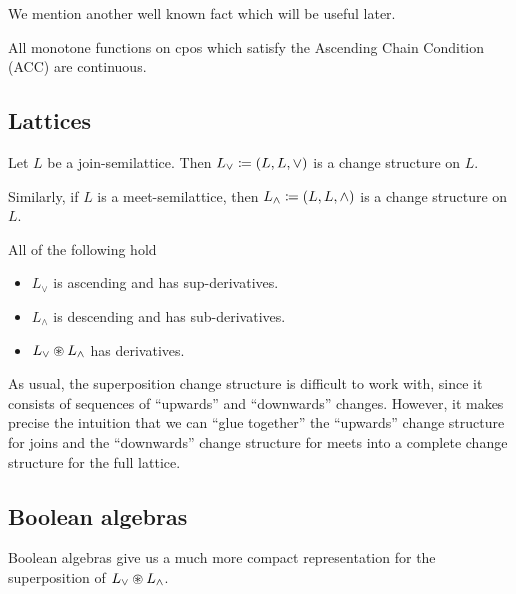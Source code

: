 We mention another well known fact which will be useful later.

\begin{prop}
\label{prop:monotoneContinuous}
  All monotone functions on cpos which satisfy the Ascending Chain Condition
  (ACC) are continuous.
\end{prop}

\subsection{Lattices}

\begin{defn}
  Let $L$ be a join-semilattice. Then $L_\vee \coloneqq (L,L,\vee)$ is a change
  structure on $L$.

  Similarly, if $L$ is a meet-semilattice, then $L_\wedge \coloneqq (L,L,\wedge)$ is a change
  structure on $L$.
\end{defn}

\begin{prop}
  All of the following hold
  \begin{itemize}
    \item $L_\vee$ is ascending and has sup-derivatives.
    \item $L_\wedge$ is descending and has sub-derivatives.
    \item $L_\vee \circledast L_\wedge$ has derivatives.
  \end{itemize}
\end{prop}

As usual, the superposition change structure is difficult to work with, since it
consists of sequences of ``upwards'' and ``downwards'' changes. However, it
makes precise the intuition that we can ``glue together'' the ``upwards'' change
structure for joins and the ``downwards'' change structure for meets into a
complete change structure for the full lattice.

\subsection{Boolean algebras}

Boolean algebras give us a much more compact representation for the
superposition of $L_\vee \circledast L_\wedge$.

